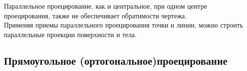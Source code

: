 \documentclass[a4paper, 12pt]{article}
\begin{document}
Параллельное проецирование, как и центральное, при одном центре проецирования, также не обеспечивает обратимости чертежа.\\
Применяя приемы параллельного проецирования точки и линии, можно строить параллельные проекции поверхности и тела.\\

\subsection{Прямоугольное (ортогональное)проецирование}
\end{document}
